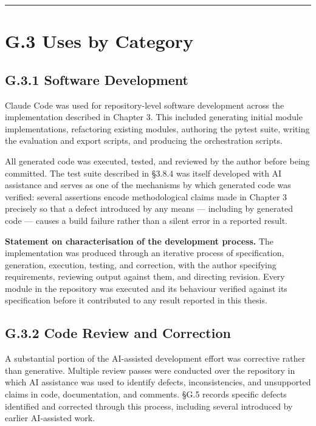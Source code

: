 \begin{center}\rule{0.5\linewidth}{0.5pt}\end{center}

\hypertarget{g.3-uses-by-category}{%
\section{G.3 Uses by Category}\label{g.3-uses-by-category}}

\hypertarget{g.3.1-software-development}{%
\subsection{G.3.1 Software Development}\label{g.3.1-software-development}}

Claude Code was used for repository-level software development across the implementation described in Chapter 3. This included generating initial module implementations, refactoring existing modules, authoring the pytest suite, writing the evaluation and export scripts, and producing the orchestration scripts.

All generated code was executed, tested, and reviewed by the author before being committed. The test suite described in §3.8.4 was itself developed with AI assistance and serves as one of the mechanisms by which generated code was verified: several assertions encode methodological claims made in Chapter 3 precisely so that a defect introduced by any means --- including by generated code --- causes a build failure rather than a silent error in a reported result.

\textbf{Statement on characterisation of the development process.} The implementation was produced through an iterative process of specification, generation, execution, testing, and correction, with the author specifying requirements, reviewing output against them, and directing revision. Every module in the repository was executed and its behaviour verified against its specification before it contributed to any result reported in this thesis.

\hypertarget{g.3.2-code-review-and-correction}{%
\subsection{G.3.2 Code Review and Correction}\label{g.3.2-code-review-and-correction}}

A substantial portion of the AI-assisted development effort was corrective rather than generative. Multiple review passes were conducted over the repository in which AI assistance was used to identify defects, inconsistencies, and unsupported claims in code, documentation, and comments. §G.5 records specific defects identified and corrected through this process, including several introduced by earlier AI-assisted work.

